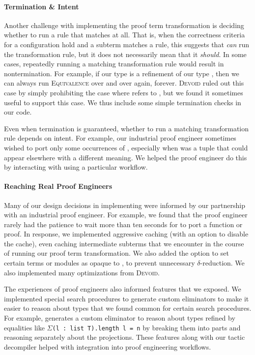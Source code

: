 \paragraph{Termination \& Intent}

Another challenge with implementing the proof term transformation is deciding whether to run a rule that matches at all.
That is, when the correctness criteria for a configuration hold and a subterm matches a rule, this suggests that \toolname \textit{can}
run the transformation rule, but it does not necessarily mean that it \textit{should}.
In some cases, repeatedly running a matching transformation rule would result in nontermination.
For example, if our type \B is a refinement of our type \A, then we can always run \textsc{Equivalence}
over and over again, forever.
\textsc{Devoid} ruled out this case by simply prohibiting the case where \B refers to \A, but we found it sometimes
useful to support this case.
We thus include some simple termination checks in our code.

Even when termination is guaranteed, whether to run a matching transformation rule
depends on intent.
For example, our industrial proof engineer sometimes wished to port only some occurrences of \A,
especially when \A was a tuple that could appear elsewhere
with a different meaning.
We helped the proof engineer do this by interacting with \toolname using a particular workflow.

\paragraph{Reaching Real Proof Engineers}
Many of our design decisions in implementing \toolname were informed by our partnership with
an industrial proof engineer.
For example, we found that the proof engineer rarely had the patience to wait more than ten seconds
for \toolname to port a function or proof.
In response, we implemented aggressive caching (with an option to disable the cache), even caching intermediate subterms that
we encounter in the course of running our proof term transformation.
We also added the option to set certain terms or modules as opaque to \toolname, to prevent
unnecessary $\delta$-reduction.
We also implemented many optimizations from \textsc{Devoid}.

The experiences of proof engineers also informed features that we exposed.
We implemented special search procedures to generate custom eliminators to make it easier to reason about
types that we found common for certain search procedures.
For example, \toolname generates a custom eliminator to reason about types refined by equalities like $\Sigma$\lstinline{(l : list T).length l = n}
by breaking them into parts and reasoning separately about the projections.
These features along with our tactic decompiler helped with integration into proof engineering workflows.

